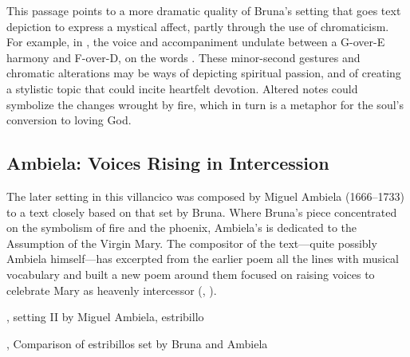 
This passage points to a more dramatic quality of Bruna's setting that goes
text depiction to express a mystical affect, partly through the use of
chromaticism.
For example, in , the voice and accompaniment undulate between a
G-over-E\fl{} harmony and F\sh-over-D, on the words .
These minor-second gestures and chromatic alterations may be
ways of depicting spiritual passion, and of creating a stylistic topic that
could incite heartfelt devotion.
Altered notes could symbolize the changes wrought by fire, which in turn is a
metaphor for the soul's conversion to loving God.  


\subsection{Ambiela: Voices Rising in Intercession}

The later setting in this villancico was composed by Miguel Ambiela
(1666--1733) to a text closely based on that set by Bruna.
Where Bruna's piece concentrated on the symbolism of fire and the phoenix,
Ambiela's is dedicated to the Assumption of the Virgin Mary.
The compositor of the text---quite possibly Ambiela himself---has excerpted
from the earlier poem all the lines with musical vocabulary and built a new
poem around them focused on raising voices to celebrate Mary as heavenly
intercessor (, ).


{, setting II by Miguel Ambiela, estribillo}

{, Comparison of estribillos set by Bruna and Ambiela}

